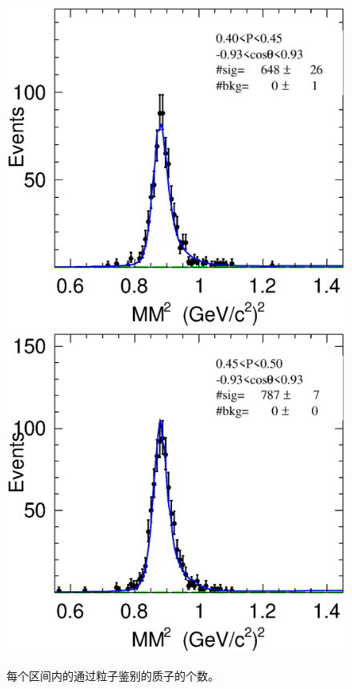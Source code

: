 \begin{figure}[htbp]
{        \includegraphics[width = 5 cm]{section/append/fig/Plot_MMSq_4_0_data.eps}
        \includegraphics[width = 5 cm]{section/append/fig/Plot_MMSq_5_0_data.eps}       
    }
    \caption{每个区间内的通过粒子鉴别的质子的个数。}%
    \label{fig:pass_PID}
\end{figure}

